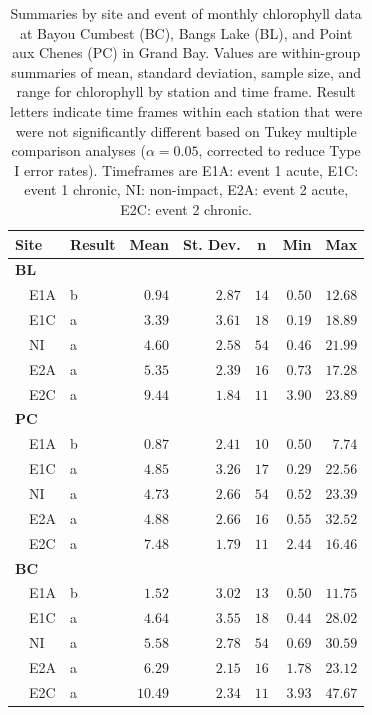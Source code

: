 \documentclass[letterpaper,12pt]{article}\usepackage[]{graphicx}\usepackage[]{color}
\begin{document}
\begin{table}[!tbp]
\caption{Summaries by site and event of monthly chlorophyll data at Bayou Cumbest (BC), Bangs Lake (BL), and Point aux Chenes (PC) in Grand Bay.  Values are within-group summaries of mean, standard deviation, sample size, and range for chlorophyll by station and time frame.  Result letters indicate time frames within each station that were were not significantly different based on Tukey multiple comparison analyses ($\alpha = 0.05$, corrected to reduce Type I error rates). Timeframes are E1A: event 1 acute, E1C: event 1 chronic, NI: non-impact, E2A: event 2 acute, E2C: event 2 chronic.\label{tab:chltab}} 
\begin{center}
\begin{tabular}{llrrrrr}
\hline\hline
\multicolumn{1}{l}{Site}&\multicolumn{1}{c}{Result}&\multicolumn{1}{c}{Mean}&\multicolumn{1}{c}{St. Dev.}&\multicolumn{1}{c}{n}&\multicolumn{1}{c}{Min}&\multicolumn{1}{c}{Max}\tabularnewline
\hline
{\bfseries BL}&&&&&&\tabularnewline
~~E1A&b&$ 0.94$&$2.87$&$14$&$0.50$&$12.68$\tabularnewline
~~E1C&a&$ 3.39$&$3.61$&$18$&$0.19$&$18.89$\tabularnewline
~~NI&a&$ 4.60$&$2.58$&$54$&$0.46$&$21.99$\tabularnewline
~~E2A&a&$ 5.35$&$2.39$&$16$&$0.73$&$17.28$\tabularnewline
~~E2C&a&$ 9.44$&$1.84$&$11$&$3.90$&$23.89$\tabularnewline
\hline
{\bfseries PC}&&&&&&\tabularnewline
~~E1A&b&$ 0.87$&$2.41$&$10$&$0.50$&$ 7.74$\tabularnewline
~~E1C&a&$ 4.85$&$3.26$&$17$&$0.29$&$22.56$\tabularnewline
~~NI&a&$ 4.73$&$2.66$&$54$&$0.52$&$23.39$\tabularnewline
~~E2A&a&$ 4.88$&$2.66$&$16$&$0.55$&$32.52$\tabularnewline
~~E2C&a&$ 7.48$&$1.79$&$11$&$2.44$&$16.46$\tabularnewline
\hline
{\bfseries BC}&&&&&&\tabularnewline
~~E1A&b&$ 1.52$&$3.02$&$13$&$0.50$&$11.75$\tabularnewline
~~E1C&a&$ 4.64$&$3.55$&$18$&$0.44$&$28.02$\tabularnewline
~~NI&a&$ 5.58$&$2.78$&$54$&$0.69$&$30.59$\tabularnewline
~~E2A&a&$ 6.29$&$2.15$&$16$&$1.78$&$23.12$\tabularnewline
~~E2C&a&$10.49$&$2.34$&$11$&$3.93$&$47.67$\tabularnewline
\hline
\end{tabular}\end{center}

\end{table}

\clearpage
\end{document}
